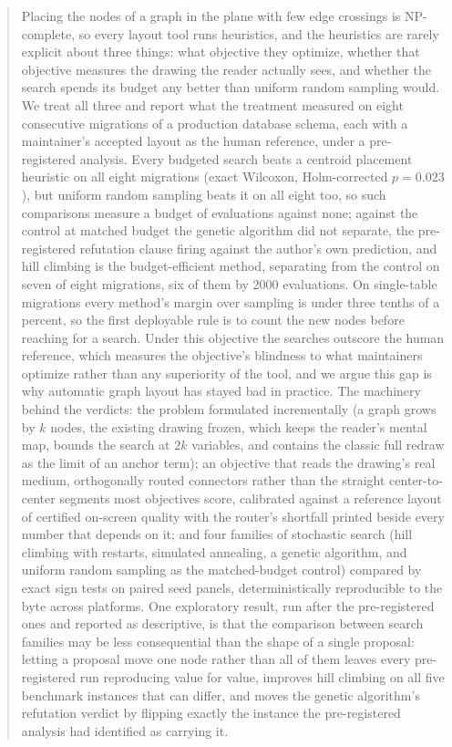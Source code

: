 \documentclass[11pt]{article}
\begin{document}
\begin{abstract}
Placing the nodes of a graph in the plane with few edge crossings is NP-complete, so every
layout tool runs heuristics, and the heuristics are rarely explicit about three things: what
objective they optimize, whether that objective measures the drawing the reader actually
sees, and whether the search spends its budget any better than uniform random sampling
would. We treat all three and report what the treatment measured on eight consecutive
migrations of a production database schema, each with a maintainer's accepted layout as the
human reference, under a pre-registered analysis. Every budgeted search beats a centroid
placement heuristic on all eight migrations (exact Wilcoxon, Holm-corrected $p = 0.023$),
but uniform random sampling beats it on all eight too, so such comparisons measure a budget
of evaluations against none; against the control at matched budget the genetic algorithm
did not separate, the pre-registered refutation clause firing against the author's own
prediction, and hill climbing is the budget-efficient method, separating from the control
on seven of eight migrations, six of them by 2000 evaluations. On single-table migrations
every method's margin over sampling is under three tenths of a percent, so the first
deployable rule is to count the new nodes before reaching for a search. Under this
objective the searches outscore the human reference, which measures the objective's
blindness to what maintainers optimize rather than any superiority of the tool, and we
argue this gap is why automatic graph layout has stayed bad in practice. The machinery
behind the verdicts: the problem formulated incrementally (a graph grows by $k$ nodes, the
existing drawing frozen, which keeps the reader's mental map, bounds the search at $2k$
variables, and contains the classic full redraw as the limit of an anchor term); an
objective that reads the drawing's real medium, orthogonally routed connectors rather than
the straight center-to-center segments most objectives score, calibrated against a
reference layout of certified on-screen quality with the router's shortfall printed beside
every number that depends on it; and four families of stochastic search (hill climbing
with restarts, simulated annealing, a genetic algorithm, and uniform random sampling as
the matched-budget control) compared by exact sign tests on paired seed panels,
deterministically reproducible to the byte across platforms. One exploratory result, run
after the pre-registered ones and reported as descriptive, is that the comparison between
search families may be less consequential than the shape of a single proposal: letting a
proposal move one node rather than all of them leaves every pre-registered run reproducing
value for value, improves hill climbing on all five benchmark instances that can differ, and
moves the genetic algorithm's refutation verdict by flipping exactly the instance the
pre-registered analysis had identified as carrying it.
\end{abstract}
\end{document}
